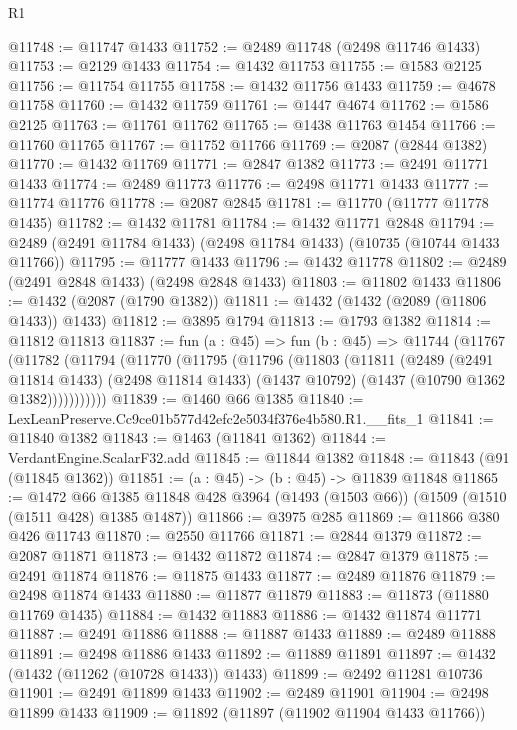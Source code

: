 \begin{lexlean}{R1}
\begin{coremodule}
@11748 := @11747 @1433
@11752 := @2489 @11748 (@2498 @11746 @1433)
@11753 := @2129 @1433
@11754 := @1432 @11753
@11755 := @1583 @2125
@11756 := @11754 @11755
@11758 := @1432 @11756 @1433
@11759 := @4678 @11758
@11760 := @1432 @11759
@11761 := @1447 @4674
@11762 := @1586 @2125
@11763 := @11761 @11762
@11765 := @1438 @11763 @1454
@11766 := @11760 @11765
@11767 := @11752 @11766
@11769 := @2087 (@2844 @1382)
@11770 := @1432 @11769
@11771 := @2847 @1382
@11773 := @2491 @11771 @1433
@11774 := @2489 @11773
@11776 := @2498 @11771 @1433
@11777 := @11774 @11776
@11778 := @2087 @2845
@11781 := @11770 (@11777 @11778 @1435)
@11782 := @1432 @11781
@11784 := @1432 @11771 @2848
@11794 := @2489 (@2491 @11784 @1433) (@2498 @11784 @1433) (@10735 (@10744 @1433 @11766))
@11795 := @11777 @1433
@11796 := @1432 @11778
@11802 := @2489 (@2491 @2848 @1433) (@2498 @2848 @1433)
@11803 := @11802 @1433
@11806 := @1432 (@2087 (@1790 @1382))
@11811 := @1432 (@1432 (@2089 (@11806 @1433)) @1433)
@11812 := @3895 @1794
@11813 := @1793 @1382
@11814 := @11812 @11813
@11837 := fun (a : @45) =>
  fun (b : @45) =>
  @11744
    (@11767
      (@11782
        (@11794
          (@11770
            (@11795
              (@11796
                (@11803
                  (@11811
                    (@2489
                      (@2491 @11814 @1433)
                      (@2498 @11814 @1433)
                      (@1437 @10792)
                      (@1437 (@10790 @1362 @1382)))))))))))
@11839 := @1460 @66 @1385
@11840 := LexLeanPreserve.Cc9ce01b577d42efc2e5034f376e4b580.R1.__fits_1
@11841 := @11840 @1382
@11843 := @1463 (@11841 @1362)
@11844 := VerdantEngine.ScalarF32.add
@11845 := @11844 @1382
@11848 := @11843 (@91 (@11845 @1362))
@11851 := (a : @45) -> (b : @45) -> @11839 @11848
@11865 := @1472
    @66
    @1385
    @11848
    @428
    @3964
    (@1493 (@1503 @66))
    (@1509 (@1510 (@1511 @428) @1385 @1487))
@11866 := @3975 @285
@11869 := @11866 @380 @426 @11743
@11870 := @2550 @11766
@11871 := @2844 @1379
@11872 := @2087 @11871
@11873 := @1432 @11872
@11874 := @2847 @1379
@11875 := @2491 @11874
@11876 := @11875 @1433
@11877 := @2489 @11876
@11879 := @2498 @11874 @1433
@11880 := @11877 @11879
@11883 := @11873 (@11880 @11769 @1435)
@11884 := @1432 @11883
@11886 := @1432 @11874 @11771
@11887 := @2491 @11886
@11888 := @11887 @1433
@11889 := @2489 @11888
@11891 := @2498 @11886 @1433
@11892 := @11889 @11891
@11897 := @1432 (@1432 (@11262 (@10728 @1433)) @1433)
@11899 := @2492 @11281 @10736
@11901 := @2491 @11899 @1433
@11902 := @2489 @11901
@11904 := @2498 @11899 @1433
@11909 := @11892 (@11897 (@11902 @11904 @1433 @11766))

\end{coremodule}
\end{lexlean}
